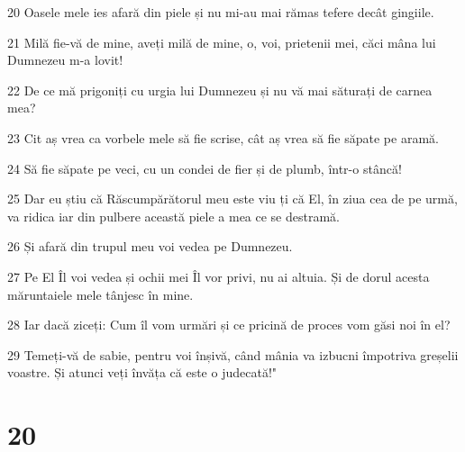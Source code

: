 \par 20 Oasele mele ies afară din piele și nu mi-au mai rămas tefere decât gingiile.
\par 21 Milă fie-vă de mine, aveți milă de mine, o, voi, prietenii mei, căci mâna lui Dumnezeu m-a lovit!
\par 22 De ce mă prigoniți cu urgia lui Dumnezeu și nu vă mai săturați de carnea mea?
\par 23 Cit aș vrea ca vorbele mele să fie scrise, cât aș vrea să fie săpate pe aramă.
\par 24 Să fie săpate pe veci, cu un condei de fier și de plumb, într-o stâncă!
\par 25 Dar eu știu că Răscumpărătorul meu este viu ți că El, în ziua cea de pe urmă, va ridica iar din pulbere această piele a mea ce se destramă.
\par 26 Și afară din trupul meu voi vedea pe Dumnezeu.
\par 27 Pe El Îl voi vedea și ochii mei Îl vor privi, nu ai altuia. Și de dorul acesta măruntaiele mele tânjesc în mine.
\par 28 Iar dacă ziceți: Cum îl vom urmări și ce pricină de proces vom găsi noi în el?
\par 29 Temeți-vă de sabie, pentru voi înșivă, când mânia va izbucni împotriva greșelii voastre. Și atunci veți învăța că este o judecată!"

\chapter{20}

